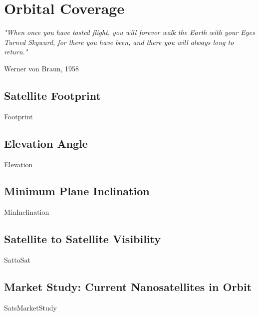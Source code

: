 \chapter{Orbital Coverage}
\epigraph{\textit{"When once you have tasted flight, you will forever walk the Earth with your Eyes Turned Skyward, for there you have been, and there you will always long to return."}}{Werner von Braun, 1958} 
\newpage
\section{Satellite Footprint}
{Footprint}

\section{Elevation Angle}
{Elevation}

\section{Minimum Plane Inclination}
{MinInclination}

\section{Satellite to Satellite Visibility}
{SattoSat}

\section{Market Study: Current Nanosatellites in Orbit}
{SatsMarketStudy}